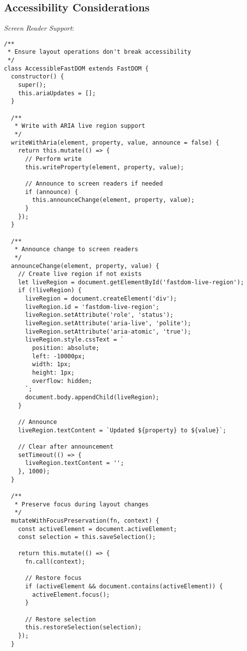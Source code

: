 \documentclass[11pt]{article}
\begin{document}
\subsection{Accessibility Considerations}
\label{sec:org67341d3}

\emph{Screen Reader Support}:

\begin{verbatim}
/**
 * Ensure layout operations don't break accessibility
 */
class AccessibleFastDOM extends FastDOM {
  constructor() {
    super();
    this.ariaUpdates = [];
  }
  
  /**
   * Write with ARIA live region support
   */
  writeWithAria(element, property, value, announce = false) {
    return this.mutate(() => {
      // Perform write
      this.writeProperty(element, property, value);
      
      // Announce to screen readers if needed
      if (announce) {
        this.announceChange(element, property, value);
      }
    });
  }
  
  /**
   * Announce change to screen readers
   */
  announceChange(element, property, value) {
    // Create live region if not exists
    let liveRegion = document.getElementById('fastdom-live-region');
    if (!liveRegion) {
      liveRegion = document.createElement('div');
      liveRegion.id = 'fastdom-live-region';
      liveRegion.setAttribute('role', 'status');
      liveRegion.setAttribute('aria-live', 'polite');
      liveRegion.setAttribute('aria-atomic', 'true');
      liveRegion.style.cssText = `
        position: absolute;
        left: -10000px;
        width: 1px;
        height: 1px;
        overflow: hidden;
      `;
      document.body.appendChild(liveRegion);
    }
    
    // Announce
    liveRegion.textContent = `Updated ${property} to ${value}`;
    
    // Clear after announcement
    setTimeout(() => {
      liveRegion.textContent = '';
    }, 1000);
  }
  
  /**
   * Preserve focus during layout changes
   */
  mutateWithFocusPreservation(fn, context) {
    const activeElement = document.activeElement;
    const selection = this.saveSelection();
    
    return this.mutate(() => {
      fn.call(context);
      
      // Restore focus
      if (activeElement && document.contains(activeElement)) {
        activeElement.focus();
      }
      
      // Restore selection
      this.restoreSelection(selection);
    });
  }
  

\end{verbatim}
\end{document}
